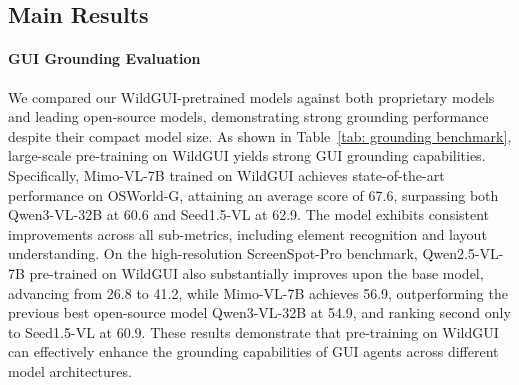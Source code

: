 \documentclass{llmxive}
\begin{document}
\subsection{Main Results}

\paragraph{GUI Grounding Evaluation}


We compared our WildGUI-pretrained models against both proprietary models and leading open-source models, demonstrating strong grounding performance despite their compact model size.
As shown in Table~\ref{tab: grounding benchmark}, large-scale pre-training on WildGUI yields strong GUI grounding capabilities. Specifically, Mimo-VL-7B trained on WildGUI achieves state-of-the-art performance on OSWorld-G, attaining an average score of 67.6, surpassing both Qwen3-VL-32B at 60.6 and Seed1.5-VL at 62.9. The model exhibits consistent improvements across all sub-metrics, including element recognition and layout understanding.
On the high-resolution ScreenSpot-Pro benchmark, Qwen2.5-VL-7B pre-trained on WildGUI also substantially improves upon the base model, advancing from 26.8 to 41.2, while Mimo-VL-7B achieves 56.9, outperforming the previous best open-source model Qwen3-VL-32B at 54.9, and ranking second only to Seed1.5-VL at 60.9. These results demonstrate that pre-training on WildGUI can effectively enhance the grounding capabilities of GUI agents across different model architectures.
\end{document}
